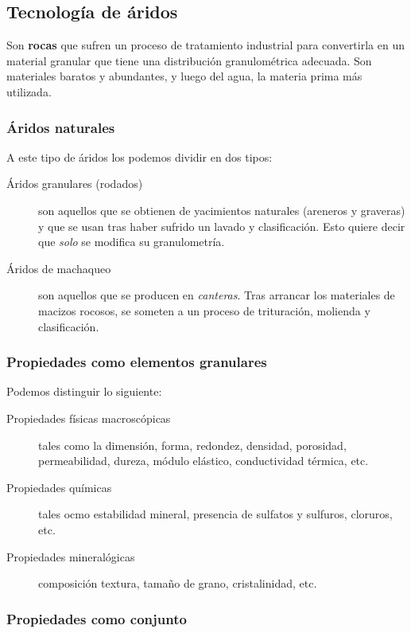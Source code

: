 \documentclass[../main.tex]{subfiles}
\begin{document}
\subsection{Tecnología de áridos}

Son \textbf{rocas} que sufren un proceso de tratamiento industrial para
convertirla en un material granular que tiene una distribución granulométrica
adecuada. Son materiales baratos y abundantes, y luego del agua, la materia
prima más utilizada.

\subsubsection{Áridos naturales}

A este tipo de áridos los podemos dividir en dos tipos:

\begin{description}
  \item[Áridos granulares (rodados)] son aquellos que se obtienen de yacimientos
    naturales (areneros y graveras) y que se usan tras haber sufrido un lavado y
    clasificación. Esto quiere decir que \textit{solo} se modifica su granulometría.

  \item[Áridos de machaqueo] son aquellos que se producen en \textit{canteras}.
    Tras arrancar los materiales de macizos rocosos, se someten a un proceso
    de trituración, molienda y clasificación. 
\end{description}

\subsubsection{Propiedades como elementos granulares}

Podemos distinguir lo siguiente:

\begin{description}
  \item[Propiedades físicas macroscópicas] tales como la dimensión, forma, 
    redondez, densidad, porosidad, permeabilidad, dureza, módulo elástico, 
    conductividad térmica, etc.
  \item[Propiedades químicas] tales ocmo estabilidad mineral, presencia de
    sulfatos y sulfuros, cloruros, etc.
  \item[Propiedades mineralógicas] composición textura, tamaño de grano, 
    cristalinidad, etc.
\end{description}

\subsubsection{Propiedades como conjunto}
\end{document}
